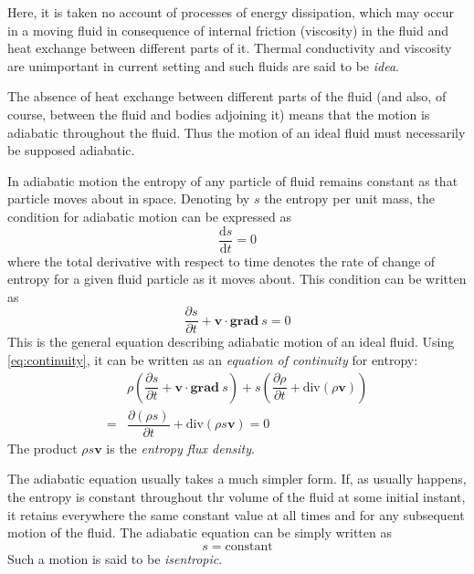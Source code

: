 \documentclass[conference]{IEEEtran}
\theoremstyle{definition}
\theoremstyle{remark}
\begin{document}
    Here, it is taken no account of processes of energy dissipation, which may occur in a moving fluid in consequence of internal friction (viscosity) in the fluid and heat exchange between different parts of it. Thermal conductivity and viscosity are unimportant in current setting and such fluids are said to be \emph{idea}.

    The absence of heat exchange between different parts of the fluid (and also, of course, between the fluid and bodies adjoining it) means that the motion is adiabatic throughout the fluid. Thus the motion of an ideal fluid must necessarily be supposed adiabatic.

    In adiabatic motion the entropy of any particle of fluid remains constant as that particle moves about in space. Denoting by $s$ the entropy per unit mass, the condition for adiabatic motion can be  expressed as
    \begin{equation}
        \dfrac{\mathrm{d} s}{\mathrm{d} t} = 0
    \end{equation}
    where the total derivative with respect to time denotes the rate of change of entropy for a given fluid particle as it moves about. This condition can be written as
    \begin{equation}
        \dfrac{\partial s}{\partial t} + \mathbf{v} \cdot \textbf{grad} \ s = 0
    \end{equation}
    This is the general equation describing adiabatic motion of an ideal fluid. Using \ref{eq:continuity}, it can be written as an \emph{equation of continuity} for entropy:
    \begin{align}
        & \rho \left(\dfrac{\partial s}{\partial t} + \mathbf{v} \cdot \textbf{grad} \ s \right) + s \left(\dfrac{\partial \rho}{\partial t} + \text{div} (\rho \mathbf{v}) \right) \nonumber \\
        =& \dfrac{\partial (\rho s)}{\partial t} + \text{div} (\rho s \mathbf{v}) = 0
    \end{align}
    The product $\rho s \mathbf{v}$ is the \emph{entropy flux density}.

    The adiabatic equation usually takes a much simpler form. If, as usually happens, the entropy is constant throughout thr volume of the fluid at some initial instant, it retains everywhere the same constant value at all times and for any subsequent motion of the fluid. The adiabatic equation can be simply written as
    \begin{equation}
        s = \text{constant}
    \end{equation}
    Such a motion is said to be \emph{isentropic}.
\end{document}
